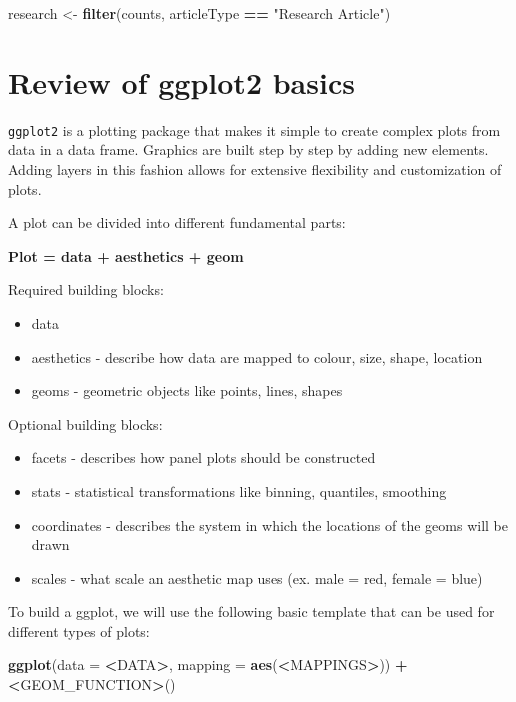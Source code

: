 \documentclass[
]{book}
\newenvironment{Shaded}{\begin{snugshade}}{\end{snugshade}}
\newcommand{\DataTypeTok}[1]{\textcolor[rgb]{0.13,0.29,0.53}{#1}}
\newcommand{\ErrorTok}[1]{\textcolor[rgb]{0.64,0.00,0.00}{\textbf{#1}}}
\newcommand{\KeywordTok}[1]{\textcolor[rgb]{0.13,0.29,0.53}{\textbf{#1}}}
\newcommand{\NormalTok}[1]{#1}
\newcommand{\OperatorTok}[1]{\textcolor[rgb]{0.81,0.36,0.00}{\textbf{#1}}}
\newcommand{\StringTok}[1]{\textcolor[rgb]{0.31,0.60,0.02}{#1}}
\providecommand{\tightlist}{%
  \setlength{\itemsep}{0pt}\setlength{\parskip}{0pt}}
\begin{document}
\begin{Shaded}
\begin{Highlighting}[]
\NormalTok{research <-}\StringTok{ }\KeywordTok{filter}\NormalTok{(counts, articleType }\OperatorTok{==}\StringTok{ "Research Article"}\NormalTok{)}
\end{Highlighting}
\end{Shaded}

\hypertarget{review-of-ggplot2-basics}{%
\section{Review of ggplot2 basics}\label{review-of-ggplot2-basics}}

\texttt{ggplot2} is a plotting package that makes it simple to create complex plots from data in a data frame. Graphics are built step by step by adding new elements. Adding layers in this fashion allows for extensive flexibility and customization of plots.

A plot can be divided into different fundamental parts:

\textbf{Plot = data + aesthetics + geom}

Required building blocks:

\begin{itemize}
\tightlist
\item
  data
\item
  aesthetics - describe how data are mapped to colour, size, shape, location
\item
  geoms - geometric objects like points, lines, shapes
\end{itemize}

Optional building blocks:

\begin{itemize}
\tightlist
\item
  facets - describes how panel plots should be constructed
\item
  stats - statistical transformations like binning, quantiles, smoothing
\item
  coordinates - describes the system in which the locations of the geoms will be drawn
\item
  scales - what scale an aesthetic map uses (ex. male = red, female = blue)
\end{itemize}

To build a ggplot, we will use the following basic template that can be used for different types of plots:

\begin{Shaded}
\begin{Highlighting}[]
\KeywordTok{ggplot}\NormalTok{(}\DataTypeTok{data =} \OperatorTok{<}\NormalTok{DATA}\OperatorTok{>}\NormalTok{, }\DataTypeTok{mapping =} \KeywordTok{aes}\NormalTok{(}\OperatorTok{<}\NormalTok{MAPPINGS}\OperatorTok{>}\NormalTok{)) }\OperatorTok{+}\StringTok{ }\ErrorTok{<}\NormalTok{GEOM_FUNCTION}\OperatorTok{>}\NormalTok{()}
\end{Highlighting}
\end{Shaded}
\end{document}
